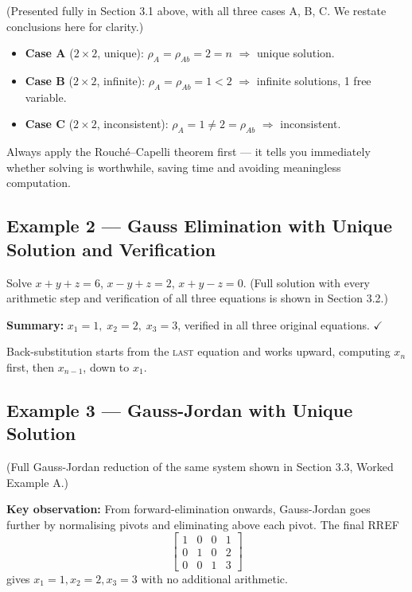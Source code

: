 \documentclass[12pt,a4paper]{article}
\begin{document}
(Presented fully in Section 3.1 above, with all three cases A, B, C.
We restate conclusions here for clarity.)

\begin{itemize}[leftmargin=1.5em]
  \item \textbf{Case A} ($2\times 2$, unique): $\rho_A = \rho_{Ab} = 2 = n$ $\Rightarrow$ unique solution.
  \item \textbf{Case B} ($2\times 2$, infinite): $\rho_A = \rho_{Ab} = 1 < 2$ $\Rightarrow$ infinite solutions, 1 free variable.
  \item \textbf{Case C} ($2\times 2$, inconsistent): $\rho_A = 1 \neq 2 = \rho_{Ab}$ $\Rightarrow$ inconsistent.
\end{itemize}

\begin{learnbox}
Always apply the Rouch\'{e}--Capelli theorem first --- it tells you immediately whether solving is
worthwhile, saving time and avoiding meaningless computation.
\end{learnbox}

\subsection*{Example 2 --- Gauss Elimination with Unique Solution and Verification}

Solve $x + y + z = 6$, $x - y + z = 2$, $x + y - z = 0$.
(Full solution with every arithmetic step and verification of all three equations
is shown in Section 3.2.)

\textbf{Summary:} $x_1 = 1,\; x_2 = 2,\; x_3 = 3$, verified in all three original equations. $\checkmark$

\begin{learnbox}
Back-substitution starts from the \textsc{last} equation and works upward, computing
$x_n$ first, then $x_{n-1}$, down to $x_1$.
\end{learnbox}

\subsection*{Example 3 --- Gauss-Jordan with Unique Solution}

(Full Gauss-Jordan reduction of the same system shown in Section 3.3, Worked Example A.)

\textbf{Key observation:} From forward-elimination onwards, Gauss-Jordan goes further by normalising
pivots and eliminating above each pivot.
The final RREF
\[
\left[\begin{array}{ccc|c} 1&0&0&1 \\ 0&1&0&2 \\ 0&0&1&3 \end{array}\right]
\]
gives $x_1=1, x_2=2, x_3=3$ with no additional arithmetic.
\end{document}
